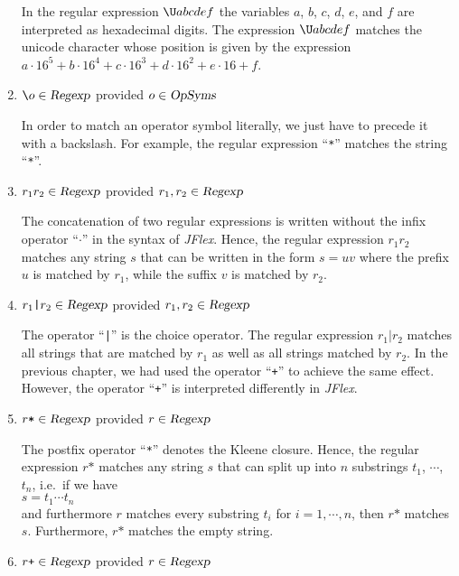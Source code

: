 \begin{enumerate}
      In the regular expression $\texttt{\symbol{92}U}abcdef$ the variables  $a$, $b$, $c$, $d$,
      $e$, and $f$ are interpreted as hexadecimal digits.  The expression
      $\texttt{\symbol{92}U}abcdef$ matches the unicode character whose position is given by the
      expression
      \\[0.2cm]
      \hspace*{1.3cm}
      $a \cdot 16^5 + b \cdot 16^4 + c \cdot 16^3 + d \cdot 16^2 + e \cdot 16 + f$.
\item $\texttt{\symbol{92}}o \in \textsl{Regexp}$ \quad provided $o \in \textsl{OpSyms}$ 
      
      In order to match an operator symbol literally, we just have to precede it with a backslash.
      For example, the regular expression ``\texttt{*}'' matches the string ``\texttt{*}''.
\item $r_1r_2 \in \textsl{Regexp}$ \quad provided $r_1,r_2 \in \textsl{Regexp}$

      The concatenation of two regular expressions is written without the  infix operator
      ``$\cdot$'' in the syntax of \textsl{JFlex}.  Hence, the regular expression $r_1r_2$ matches
      any string $s$ that can be written in the form  $s = uv$ where the prefix $u$ is matched by
      $r_1$, while the suffix $v$ is matched by $r_2$.
\item $r_1\texttt{|}r_2 \in \textsl{Regexp}$ \quad provided $r_1,r_2 \in \textsl{Regexp}$

      The operator ``\texttt{|}'' is the choice operator.  The regular expression $r_1\texttt{|}r_2$
      matches all strings that are matched by $r_1$ as well as all strings matched by  $r_2$.
      In the previous chapter, we had used the  operator ``\texttt{+}'' to achieve the same effect.
      However, the operator ``\texttt{+}'' is interpreted differently in \textsl{JFlex}.
\item $r\texttt{*} \in \textsl{Regexp}$ \quad provided $r \in \textsl{Regexp}$

      The postfix operator ``\texttt{*}'' denotes the Kleene closure.  Hence, the regular expression
      $r\texttt{*}$ matches any string $s$ that can split up into $n$ substrings $t_1$, $\cdots$,
      $t_n$, i.e.~if we have
      \\[0.2cm]
      \hspace*{1.3cm}
      $s = t_1\cdots t_n$
      \\[0.2cm]
      and furthermore $r$ matches every substring $t_i$ for $i=1, \cdots, n$, then $r\texttt{*}$ matches $s$.  Furthermore, $r\texttt{*}$
      matches the empty string.
\item $r\texttt{+} \in \textsl{Regexp}$ \quad provided $r \in \textsl{Regexp}$


\end{enumerate}
